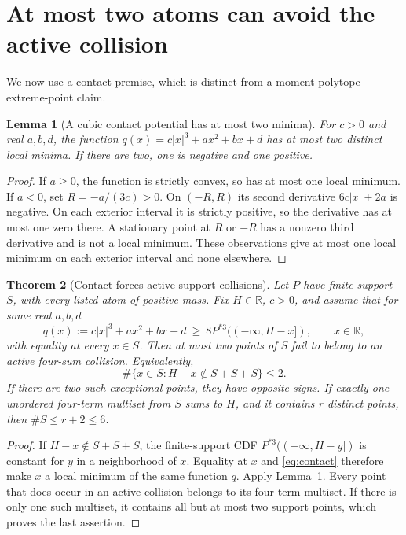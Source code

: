 \documentclass[11pt,a4paper]{article}
\newtheorem{theorem}{Theorem}\newtheorem{proposition}[theorem]{Proposition}
\newtheorem{lemma}[theorem]{Lemma}
\begin{document}
\section{At most two atoms can avoid the active collision}
We now use a contact premise, which is distinct from a moment-polytope
extreme-point claim.

\begin{lemma}[A cubic contact potential has at most two minima]
\label{lem:minima}
For $c>0$ and real $a,b,d$, the function
$q(x)=c|x|^3+ax^2+bx+d$ has at most two distinct local minima.
If there are two, one is negative and one positive.
\end{lemma}
\begin{proof}
If $a\ge0$, the function is strictly convex, so has at most one local
minimum. If $a<0$, set $R=-a/(3c)>0$. On $(-R,R)$ its second
derivative $6c|x|+2a$ is negative. On each exterior interval it is
strictly positive, so the derivative has at most one zero there.
A stationary point at $R$ or $-R$ has a nonzero third derivative and
is not a local minimum. These observations give at most one local
minimum on each exterior interval and none elsewhere.
\end{proof}

\begin{theorem}[Contact forces active support collisions]\label{thm:collision}
Let $P$ have finite support $S$, with every listed atom of positive mass.
Fix $H\in\mathbb R$, $c>0$, and assume that for some real $a,b,d$
\begin{equation}\label{eq:contact}
 q(x):=c|x|^3+ax^2+bx+d
 \ \ge\ 8P^{*3}(( -\infty,H-x]),
 \qquad x\in\mathbb R,
\end{equation}
with equality at every $x\in S$. Then at most two points of $S$ fail
to belong to an active four-sum collision. Equivalently,
\[
 \#\{x\in S:H-x\notin S+S+S\}\le2.
\]
If there are two such exceptional points, they have opposite signs.
If exactly one unordered four-term multiset from $S$ sums to $H$, and
it contains $r$ distinct points, then $\#S\le r+2\le6$.
\end{theorem}
\begin{proof}
If $H-x\notin S+S+S$, the finite-support CDF
$P^{*3}(( -\infty,H-y])$ is constant for $y$ in a neighborhood of
$x$. Equality at $x$ and \eqref{eq:contact} therefore make $x$ a
local minimum of the same function $q$. Apply Lemma~\ref{lem:minima}.
Every point that does occur in an active collision belongs to its
four-term multiset. If there is only one such multiset, it contains
all but at most two support points, which proves the last assertion.
\end{proof}
\end{document}
